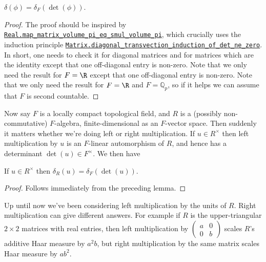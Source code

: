 \begin{lemma}
  \label{addHaarScalarFactor_eq_distribHaarChar_det}
  $\delta(\phi)=\delta_F(\det(\phi))$.
\end{lemma}
\begin{proof}
The proof should be inspired by \href{https://leanprover-community.github.io/mathlib4\_docs/Mathlib/MeasureTheory/Measure/Lebesgue/Basic.html\#Real.map\_matrix\_volume\_pi\_eq\_smul\_volume\_pi}{\tt Real.map\_matrix\_volume\_pi\_eq\_smul\_volume\_pi},
which crucially uses the induction principle \href{https://leanprover-community.github.io/mathlib4\_docs/Mathlib/LinearAlgebra/Matrix/Transvection.html\#Matrix.diagonal\_transvection\_induction\_of\_det\_ne\_zero}{\tt Matrix.diagonal\_transvection\_induction\_of\_det\_ne\_zero}.
In short, one needs to check it for diagonal matrices and for matrices which are the identity
except that one off-diagonal entry is non-zero. Note that we only need the result for $F=\R$
except that one off-diagonal entry is non-zero. Note that we only need the result for $F=\R$
and $F=\mathbb{Q}_p$, so if it helps we can assume that $F$ is second countable.
\end{proof}

  Now say $F$ is a locally compact topological field, and $R$ is a (possibly non-commutative)
  $F$-algebra, finite-dimensional as an $F$-vector space. Then suddenly it matters whether we're
  doing left or right multiplication. If $u\in R^\times$ then left multiplication by $u$
  is an $F$-linear automorphism of $R$, and hence has a determinant $\det(u)\in F^\times$.
  We then have

  \begin{lemma}
  \label{distribHaarChar_algebra}
  If $u\in R^\times$ then $\delta_R(u)=\delta_F(\det(u))$.
\end{lemma}
\begin{proof}
  Follows immediately from the preceding lemma.
\end{proof}

  Up until now we've been considering left multiplication by the units of $R$. Right multiplication
  can give different answers. For example if $R$ is the upper-triangular $2\times 2$ matrices with real
  entries, then left multiplication by $\begin{pmatrix}a&0\\0&b\end{pmatrix}$ scales $R$'s additive
  Haar measure by $a^2b$, but right multiplication by the same matrix scales Haar measure by $ab^2$.

